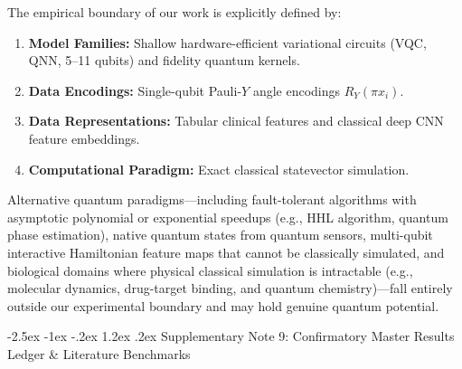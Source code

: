 \documentclass[10pt,a4paper]{article}
\makeatletter
\renewcommand{\section}{\@startsection{section}{1}{\z@}%
  {-2.5ex \@plus -1ex \@minus -.2ex}%
  {1.2ex \@plus.2ex}%
  {\normalfont\Large\sffamily\bfseries\color{naturedark}}}
\makeatother
\begin{document}
The empirical boundary of our work is explicitly defined by:
\begin{enumerate}
  \item \textbf{Model Families:} Shallow hardware-efficient variational circuits (VQC, QNN, 5--11 qubits) and fidelity quantum kernels.
  \item \textbf{Data Encodings:} Single-qubit Pauli-$Y$ angle encodings $R_Y(\pi x_i)$.
  \item \textbf{Data Representations:} Tabular clinical features and classical deep CNN feature embeddings.
  \item \textbf{Computational Paradigm:} Exact classical statevector simulation.
\end{enumerate}
Alternative quantum paradigms---including fault-tolerant algorithms with asymptotic polynomial or exponential speedups (e.g., HHL algorithm, quantum phase estimation), native quantum states from quantum sensors, multi-qubit interactive Hamiltonian feature maps that cannot be classically simulated, and biological domains where physical classical simulation is intractable (e.g., molecular dynamics, drug-target binding, and quantum chemistry)---fall entirely outside our experimental boundary and may hold genuine quantum potential.

\newpage

\section{Supplementary Note 9: Confirmatory Master Results Ledger \& Literature Benchmarks}
\end{document}
